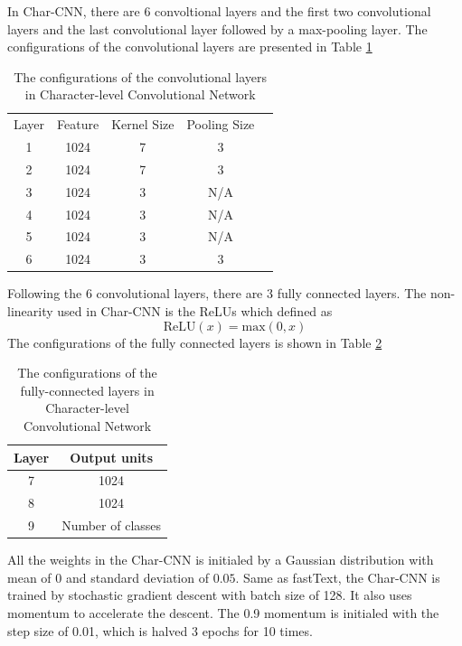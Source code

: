 In Char-CNN, there are 6 convoltional layers and the first two convolutional layers and the last convolutional layer followed by a max-pooling layer. The configurations of the convolutional layers are presented in Table \ref{config_char_cnn}

\begin{table}[]
\centering
\begin{tabular}{ccccc}
Layer & Feature & Kernel Size & Pooling Size &  \\ \cline{1-4}
1     & 1024    & 7           & 3            &  \\
2     & 1024    & 7           & 3            &  \\
3     & 1024    & 3           & N/A          &  \\
4     & 1024    & 3           & N/A          &  \\
5     & 1024    & 3           & N/A          &  \\
6     & 1024    & 3           & 3            & 
\end{tabular}
\caption{The configurations of the convolutional layers in Character-level Convolutional Network}
\label{config_char_cnn}
\end{table}

Following the 6 convolutional layers, there are 3 fully connected layers. The non-linearity used in Char-CNN is the ReLUs which defined as 
\begin{equation}
\mbox{ReLU}(x) = \mbox{max}(0,x)
\end{equation}
The configurations of the fully connected layers is shown in Table \ref{config_char_fl}
\begin{table}[]
\centering
\begin{tabular}{cc}
Layer & Output units      \\ \hline
7     & 1024              \\
8     & 1024              \\
9     & Number of classes
\end{tabular}
\caption{The configurations of the fully-connected layers in Character-level Convolutional Network}
\label{config_char_fl}
\end{table}

All the weights in the Char-CNN is initialed by a Gaussian distribution with mean of $0$ and standard deviation of $0.05$. Same as fastText, the Char-CNN is trained by stochastic gradient descent with batch size of 128. It also uses momentum to accelerate the descent. The 0.9 momentum is initialed with the step size of 0.01, which is halved 3 epochs for 10 times.

